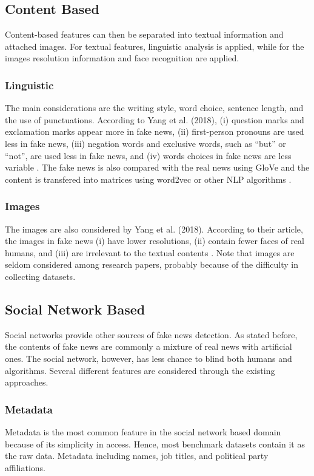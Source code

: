 \documentclass[sigconf ,nonacm]{acmart}
\begin{document}
\subsection{Content Based}
Content-based features can then be separated into textual information and attached images. For textual features, linguistic analysis is applied, while for the images resolution information and face recognition are applied.


\subsubsection{Linguistic} The main considerations are the writing style, word choice, sentence length, and the use of punctuations. According to Yang et al. (2018), (i) question marks and exclamation marks appear more in fake news, (ii) first-person pronouns are used less in fake news, (iii) negation words and exclusive words, such as ``but'' or ``not'',  are used less in fake news, and (iv) words choices in fake news are less variable \cite{yang2018ti}. The fake news is also compared with the real news using GloVe and the content is transfered into matrices using word2vec or other NLP algorithms \cite{glove,w2v}.

\subsubsection{Images} The images are also considered by Yang et al. (2018). According to their article, the images in fake news (i) have lower resolutions, (ii) contain fewer faces of real humans, and (iii) are irrelevant to the textual contents \cite{yang2018ti}. Note that images are seldom considered among research papers, probably because of the difficulty in collecting datasets.

\subsection{Social Network Based}
Social networks provide other sources of fake news detection. As stated before, the contents of fake news are commonly a mixture of real news with artificial ones. The social network, however, has less chance to blind both humans and algorithms. Several different features are considered through the existing approaches.

\subsubsection{Metadata} Metadata is the most common feature in the social network based domain because of its simplicity in access. Hence, most benchmark datasets contain it as the raw data. Metadata including names, job titles, and political party affiliations.
\end{document}
